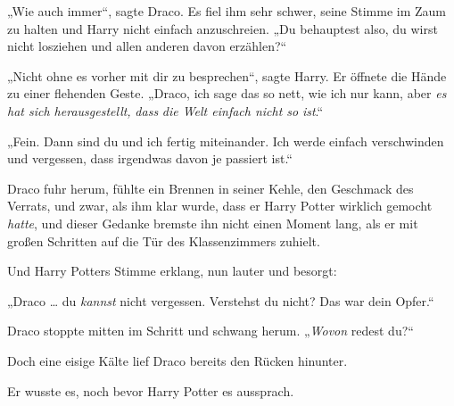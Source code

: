 „Wie auch immer“, sagte Draco. Es fiel ihm sehr schwer, seine Stimme im Zaum zu halten und Harry nicht einfach anzuschreien.
„Du behauptest also, du wirst nicht losziehen und allen anderen davon erzählen?“

„Nicht ohne es vorher mit dir zu besprechen“, sagte Harry. Er öffnete die Hände zu einer flehenden Geste.
„Draco, ich sage das so nett, wie ich nur kann, aber \emph{es hat sich herausgestellt,} \emph{dass} \emph{die Welt einfach nicht so} \emph{ist}.“

„Fein. Dann sind du und ich fertig miteinander. Ich werde einfach verschwinden und vergessen, dass irgendwas davon je passiert ist.“

Draco fuhr herum, fühlte ein Brennen in seiner Kehle, den Geschmack des Verrats, und zwar, als ihm klar wurde, dass er Harry Potter wirklich gemocht \emph{hatte}, und dieser Gedanke bremste ihn nicht einen Moment lang, als er mit großen Schritten auf die Tür des Klassenzimmers zuhielt.

Und Harry Potters Stimme erklang, nun lauter und besorgt:

„Draco … du \emph{kannst} nicht vergessen. Verstehst du nicht? Das war dein Opfer.“

Draco stoppte mitten im Schritt und schwang herum.
„\emph{Wovon} redest du?“

Doch eine eisige Kälte lief Draco bereits den Rücken hinunter.

Er wusste es, noch bevor Harry Potter es aussprach.

